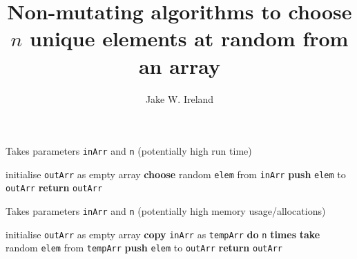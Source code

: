 \documentclass{arteacle}
\title{Non-mutating algorithms to choose $n$ unique elements at random from an array}
\author{Jake W. Ireland}
\begin{document}
		
\begin{algorithm}[h!]
		\begin{algorithmic}
			\caption{Takes parameters \texttt{inArr} and \texttt{n} (potentially high run time)}
			\State initialise \texttt{outArr} as empty array
				\State \textbf{choose} random \texttt{elem} from \texttt{inArr}
					\State \textbf{push} \texttt{elem} to \texttt{outArr}
				\EndIf
			\EndWhile
			\State \textbf{return} \texttt{outArr}
		\end{algorithmic}
\end{algorithm}

\begin{algorithm}[h!]
		\begin{algorithmic}
		\caption{Takes parameters \texttt{inArr} and \texttt{n} (potentially high memory usage/allocations)}
			\State initialise \texttt{outArr} as empty array
			\State \textbf{copy} \texttt{inArr} as \texttt{tempArr}
        	\State\textbf{do }\texttt{n}\textbf{ times}
        		\Indent
        			\State \textbf{take} random \texttt{elem} from \texttt{tempArr}
					\State \textbf{push} \texttt{elem} to \texttt{outArr}
        		\EndIndent
			\State \textbf{return} \texttt{outArr}
		\end{algorithmic}
\end{algorithm}
		
			
	
\end{document}
